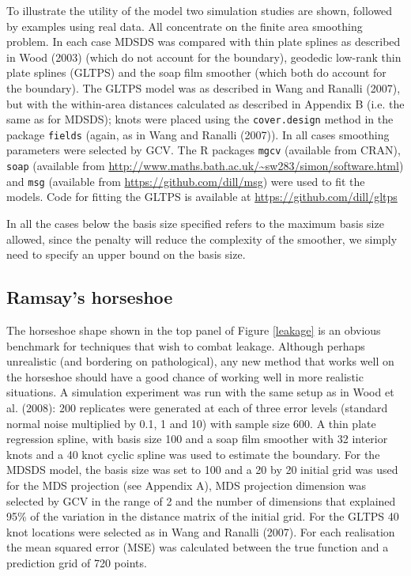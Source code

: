 \documentclass[useAMS, referee]{biom}
\begin{document}
To illustrate the utility of the model two simulation studies are shown, followed by examples using real data. All concentrate on the finite area smoothing problem. In each case MDSDS was compared with thin plate splines as described in Wood (2003) (which do not account for the boundary), geodedic low-rank thin plate splines (GLTPS) and the soap film smoother (which both do account for the boundary). The GLTPS model was as described in Wang and Ranalli (2007), but with the within-area distances calculated as described in Appendix B (i.e. the same as for MDSDS); knots were placed using the \texttt{cover.design} method in the package \texttt{fields} (again, as in Wang and Ranalli (2007)). In all cases smoothing parameters were selected by GCV. The \textsf{R} packages \texttt{mgcv} (available from CRAN), \texttt{soap} (available from
\url{http://www.maths.bath.ac.uk/~sw283/simon/software.html}) and \texttt{msg} (available from \url{https://github.com/dill/msg}) were used to fit the models. Code for fitting the GLTPS is available at \url{https://github.com/dill/gltps}

In all the cases below the basis size specified refers to the maximum basis size allowed, since the penalty will reduce the complexity of the smoother, we simply need to specify an upper bound on the basis size.


\subsection{Ramsay's horseshoe}

The horseshoe shape shown in the top panel of Figure \ref{leakage} is an obvious benchmark for techniques that wish to combat leakage. Although perhaps unrealistic (and bordering on pathological), any new method that works well on the horseshoe should have a good chance of working well in more realistic situations. A simulation experiment was run with the same setup as in Wood et al. (2008): 200 replicates were generated at each of three error levels (standard normal noise multiplied by 0.1, 1 and 10) with sample size 600. A thin plate regression spline, with basis size 100 and a soap film smoother with 32 interior knots  and a 40 knot cyclic  spline was used to estimate the boundary. For the MDSDS model, the basis size was set to 100 and a 20 by 20 initial grid was used for the MDS projection (see Appendix A), MDS projection dimension was selected by GCV in the range of 2 and the number of dimensions that explained 95\% of the variation in the distance matrix of the initial grid. For the GLTPS 40 knot locations were selected as in Wang and Ranalli (2007). For each realisation the mean squared error (MSE) was calculated between the true function and a prediction grid of 720 points.
\end{document}
